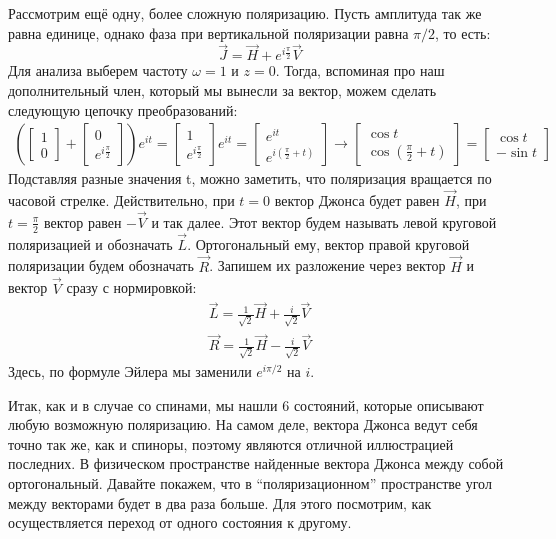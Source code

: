 Рассмотрим ещё одну, более сложную поляризацию. Пусть амплитуда так же равна единице, однако фаза при вертикальной поляризации равна $\pi/2$, то есть:
\[
\Vec{J} = \Vec{H} + e^{i\frac{\pi}{2}}\Vec{V}
\]
Для анализа выберем частоту $\omega = 1$ и $z = 0$. Тогда, вспоминая про наш дополнительный член, который мы вынесли за вектор, можем сделать следующую цепочку преобразований:
\begin{align*}
(\begin{bmatrix} 1 \\ 0 \end{bmatrix} + \begin{bmatrix} 0 \\ e^{i\frac{\pi}{2}} \end{bmatrix})e^{it} = \begin{bmatrix} 1 \\ e^{i\frac{\pi}{2}} \end{bmatrix} e^{it} = \begin{bmatrix} e^{it} \\ e^{i(\frac{\pi}{2} + t)} \end{bmatrix} \rightarrow \begin{bmatrix} \cos t \\ \cos(\frac{\pi}{2} + t) \end{bmatrix} = \begin{bmatrix} \cos t \\ -\sin t \end{bmatrix}
\end{align*}
Подставляя разные значения t, можно заметить, что поляризация вращается по часовой стрелке. Действительно, при $t = 0$ вектор Джонса будет равен $\Vec{H}$, при $t = \frac{\pi}{2}$ вектор равен $-\Vec{V}$ и так далее. Этот вектор будем называть левой круговой поляризацией и обозначать $\Vec{L}$. Ортогональный ему, вектор правой круговой поляризации будем обозначать $\Vec{R}$. Запишем их разложение через вектор $\Vec{H}$ и вектор $\Vec{V}$ сразу с нормировкой:
\begin{gather*}
    \Vec{L} = \frac{1}{\sqrt{2}}\Vec{H} + \frac{i}{\sqrt{2}}\Vec{V}\\
    \Vec{R} = \frac{1}{\sqrt{2}}\Vec{H} - \frac{i}{\sqrt{2}}\Vec{V}
\end{gather*}
Здесь, по формуле Эйлера мы заменили $e^{i\pi/2}$ на $i$.

Итак, как и в случае со спинами, мы нашли 6 состояний, которые описывают любую возможную поляризацию. На самом деле, вектора Джонса ведут себя точно так же, как и спиноры, поэтому являются отличной иллюстрацией последних. В физическом пространстве найденные вектора Джонса между собой ортогональный. Давайте покажем, что в ``поляризационном'' пространстве угол между векторами будет в два раза больше. Для этого посмотрим, как осуществляется переход от одного состояния к другому.
